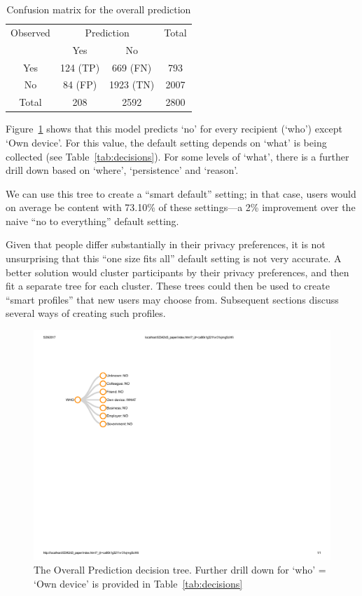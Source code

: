 \begin{table}
	\centering
	\caption{Confusion matrix for the overall prediction}
	\label{tab:confusion_matrix}
	\begin{tabular}{c|c|c|c} \hline
		Observed &\multicolumn{2}{c|}{Prediction} & Total\\ \cline{2-3}
		& Yes     & No       &  \\ \hline
		Yes   & 124 (TP) & 669 (FN)  & 793   \\ \hline
		No    & 84 (FP)  & 1923 (TN) & 2007  \\ \hline
		Total & 208     & 2592     & 2800  \\ \hline
	\end{tabular}
\end{table}

Figure~\ref{fig:naive_cls} shows that this model predicts `no' for every recipient (`who') except `Own device'. For this value, the default setting depends on `what' is being collected (see Table~\ref{tab:decisions}). For some levels of `what', there is a further drill down based on `where', `persistence' and `reason'.

We can use this tree to create a ``smart default'' setting; in that case, users would on average be content with 73.10\% of these settings---a 2\% improvement over the naive ``no to everything'' default setting. 

Given that people differ substantially in their privacy preferences, it is not unsurprising that this ``one size fits all'' default setting is not very accurate. A better solution would cluster participants by their privacy preferences, and then fit a separate tree for each cluster. These trees could then be used to create ``smart profiles'' that new users may choose from. Subsequent sections discuss several ways of creating such profiles.

\begin{figure}
	\centering
	\includegraphics[width=.22\textwidth]{figures/overall.pdf}
	\caption{The Overall Prediction decision tree. Further drill down for `who' = `Own device' is provided in Table~\ref{tab:decisions}}
	\label{fig:naive_cls}
\end{figure}

